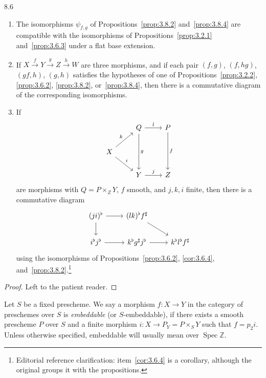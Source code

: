 \begin{bookproposition}{8.6}\label{prop:3.8.6}
\begin{enumerate}
\item[a)] The isomorphisms $\psi_{f,g}$ of Propositions~\ref{prop:3.8.2} and~\ref{prop:3.8.4} are compatible with the isomorphisms of Propositions~\ref{prop:3.2.1} and~\ref{prop:3.6.3} under a flat base extension.
\item[b)] If $X\xrightarrow{f} Y\xrightarrow{g} Z\xrightarrow{h} W$ are three morphisms, and if each pair $(f,g)$, $(f,hg)$, $(gf,h)$, $(g,h)$ satisfies the hypotheses of one of Propositions~\ref{prop:3.2.2}, \ref{prop:3.6.2}, \ref{prop:3.8.2}, or~\ref{prop:3.8.4}, then there is a commutative diagram of the corresponding isomorphisms.
\item[c)] If
\[
\begin{tikzcd}
	& Q \arrow[r, "l"] \arrow[dd, "g"] & P \arrow[dd, "f"] \\
	X \arrow[ur, "k"] \arrow[dr, "i"] & & \\
	& Y \arrow[r, "j"] & Z
\end{tikzcd}
\]
are morphisms with $Q = P \times_Z Y$, $f$ smooth, and $j,k,i$ finite, then
there is a commutative diagram
\[
\begin{tikzcd}
	(ji)^\flat \arrow[r] \arrow[d] & (lk)^\flat f^\sharp \arrow[dr] & \\
	i^\flat j^\flat \arrow[r] & k^\flat g^\sharp j^\flat \arrow[r] & k^\flat l^\flat f^\sharp
\end{tikzcd}
\]
using the isomorphisms of Propositions~\ref{prop:3.6.2}, \ref{cor:3.6.4}, and~\ref{prop:3.8.2}.\footnote{Editorial reference clarification: item~\ref{cor:3.6.4} is a corollary, although the original groups it with the propositions.}
\end{enumerate}
\end{bookproposition}

\begin{proof}
Left to the patient reader.
\end{proof}

\begin{definition*}
Let $S$ be a fixed prescheme. We say a morphism $f\colon X\to Y$ in the category of preschemes over $S$ is \emph{embeddable} (or $S$-embeddable), if there exists a smooth prescheme $P$ over $S$ and a finite morphism $i\colon X\to P_Y=P\times_S Y$ such that $f=p_2i$. Unless otherwise specified, embeddable will usually mean over $\operatorname{Spec}\mathbb{Z}$.
\end{definition*}

